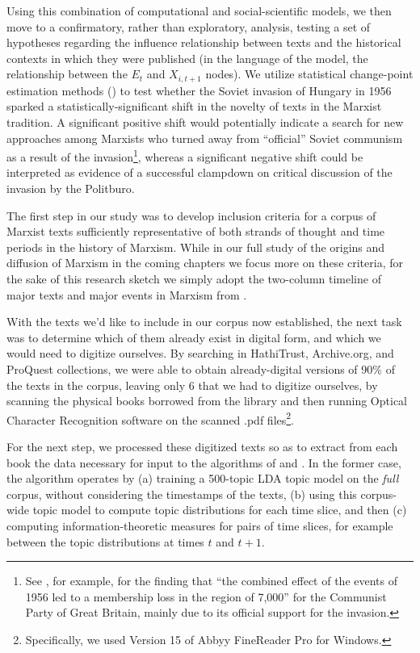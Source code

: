 \documentclass[11pt]{article}
\begin{document}
Using this combination of computational and social-scientific models, we then move to a confirmatory, rather than exploratory, analysis, testing a set of hypotheses regarding the influence relationship between texts and the historical contexts in which they were published (in the language of the model, the relationship between the $E_t$ and $X_{i,t+1}$ nodes). We utilize statistical change-point estimation methods (\cite{kulkarni_statistically_2015}) to test whether the Soviet invasion of Hungary in 1956 sparked a statistically-significant shift in the novelty of texts in the Marxist tradition. A significant positive shift would potentially indicate a search for new approaches among Marxists who turned away from ``official'' Soviet communism as a result of the invasion\footnote{See \cite{hudson_double_1992}, for example, for the finding that ``the combined effect of the events of 1956 led to a membership loss in the region of 7,000'' for the Communist Party of Great Britain, mainly due to its official support for the invasion.}, whereas a significant negative shift could be interpreted as evidence of a successful clampdown on critical discussion of the invasion by the Politburo.

The first step in our study was to develop inclusion criteria for a corpus of Marxist texts sufficiently representative of both strands of thought and time periods in the history of Marxism. While in our full study of the origins and diffusion of Marxism in the coming chapters we focus more on these criteria, for the sake of this research sketch we simply adopt the two-column timeline of major texts and major events in Marxism from \cite{mclellan_marxism_2007}.

With the texts we'd like to include in our corpus now established, the next task was to determine which of them already exist in digital form, and which we would need to digitize ourselves. By searching in HathiTrust, Archive.org, and ProQuest collections, we were able to obtain already-digital versions of 90\% of the texts in the corpus, leaving only 6 that we had to digitize ourselves, by scanning the physical books borrowed from the library and then running Optical Character Recognition software on the scanned .pdf files\footnote{Specifically, we used Version 15 of Abbyy FineReader Pro for Windows.}.

For the next step, we processed these digitized texts so as to extract from each book the data necessary for input to the algorithms of \cite{barron_individuals_2018} and \cite{gerow_measuring_2018}. In the former case, the algorithm operates by (a) training a 500-topic LDA topic model on the \textit{full} corpus, without considering the timestamps of the texts, (b) using this corpus-wide topic model to compute topic distributions for each time slice, and then (c) computing information-theoretic measures for pairs of time slices, for example between the topic distributions at times $t$ and $t+1$.
\end{document}
